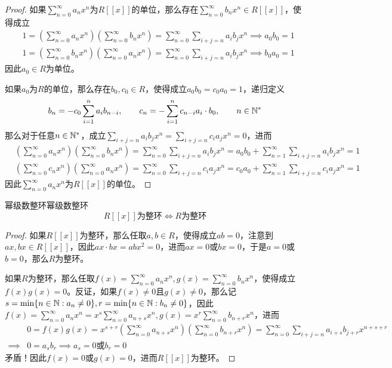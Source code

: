 \begin{proof}
	如果$\displaystyle\sum_{n=0}^{\infty}a_n x^n$为$R[[x]]$的单位，那么存在$\displaystyle\sum_{n=0}^{\infty}b_n x^n\in R[[x]]$，使得成立
	\begin{align*}
		&1=\left( \sum_{n=0}^{\infty}a_n x^n \right)\left( \sum_{n=0}^{\infty}b_n x^n \right)
		=\sum_{n=0}^{\infty}\sum_{i+j=n}a_i b_j x^{n}\implies a_0b_0=1\\
		&1=\left( \sum_{n=0}^{\infty}b_n x^n \right)\left( \sum_{n=0}^{\infty}a_n x^n \right)
		=\sum_{n=0}^{\infty}\sum_{i+j=n}a_i b_j x^{n}\implies b_0a_0=1
	\end{align*}
	因此$a_0\in R$为单位。
	
	如果$a_0$为$R$的单位，那么存在$b_0,c_0\in R$，使得成立$a_0b_0=c_0a_0=1$，递归定义
	$$
	b_{n}=-c_0\sum_{i=1}^{n}a_ib_{n-i},\qquad c_n=-\sum_{i=1}^{n}c_{n-i}a_i\cdot b_0,\qquad n\in\mathbb{N}^*
	$$
	那么对于任意$n\in\mathbb{N}^*$，成立$\displaystyle \sum_{i+j=n}a_i b_j x^{n}=\sum_{i+j=n}c_i a_j x^{n}=0$​，进而
	\begin{align*}
		&\left( \sum_{n=0}^{\infty}a_n x^n \right)\left( \sum_{n=0}^{\infty}b_n x^n \right)
		=\sum_{n=0}^{\infty}\sum_{i+j=n}a_i b_j x^{n}=a_0b_0+\sum_{n=1}^{\infty}\sum_{i+j=n}a_i b_j x^{n}=1\\
		&\left( \sum_{n=0}^{\infty}c_n x^n \right)\left( \sum_{n=0}^{\infty}a_n x^n \right)
		=\sum_{n=0}^{\infty}\sum_{i+j=n}c_i a_j x^{n}=c_0a_0+\sum_{n=1}^{\infty}\sum_{i+j=n}c_i a_j x^{n}=1
	\end{align*}
	因此$\displaystyle\sum_{n=0}^{\infty}a_n x^n$为$R[[x]]$的单位。
\end{proof}

\begin{proposition}{幂级数整环}{幂级数整环}
	$$
	R[[x]]\text{为整环}\iff R\text{为整环}
	$$
\end{proposition}

\begin{proof}
	如果$R[[x]]$为整环，那么任取$a,b\in R$，使得成立$ab=0$，注意到$ax,bx\in R[[x]]$，因此$ax\cdot bx=abx^2=0$，进而$ax=0$或$bx=0$，于是$a=0$或$b=0$，那么$R$为整环。
	
	如果$R$为整环，那么任取$\displaystyle f(x)=\sum_{n=0}^{\infty}a_n x^n,g(x)=\sum_{n=0}^{\infty}b_n x^n$，使得成立$f(x)g(x)=0$。反证，如果$f(x)\ne 0$且$g(x)\ne 0$，那么记$s=\min\{ n\in \mathbb{N}:a_n\ne 0 \},r=\min\{ n\in \mathbb{N}:b_n\ne 0 \}$，因此$\displaystyle f(x)=\sum_{n=0}^{\infty}a_n x^n=x^s\sum_{n=0}^\infty a_{n+s} x^{n},g(x)=x^r\sum_{n=0}^{\infty}b_{n+r} x^n$，进而
	\begin{align*}
		&0=f(x)g(x)=x^{s+r}\left(\sum_{n=0}^\infty a_{n+s} x^{n}\right)\left(\sum_{n=0}^\infty b_{n+r} x^{n}\right)=\sum_{n=0}^{\infty}\sum_{i+j=n}a_{i+s}b_{j+r}x^{n+s+r}\\
		\implies& 0=a_sb_r\implies a_s=0\text{或}b_r=0
	\end{align*}
	矛盾！因此$f(x)=0$或$g(x)=0$，进而$R[[x]]$为整环。
\end{proof}

